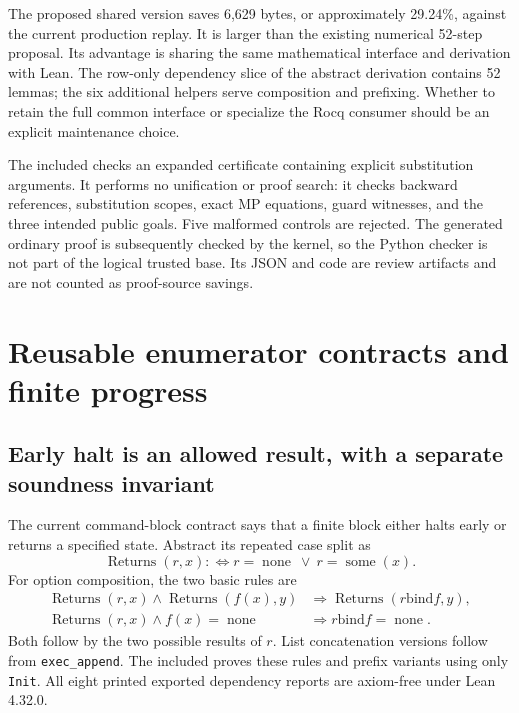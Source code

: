 \documentclass[11pt,letterpaper]{article}
\newcommand{\code}[1]{\texttt{\small #1}}
\begin{document}
The proposed shared version saves 6,629 bytes, or approximately 29.24\%, against the
current production replay. It is larger than the existing numerical 52-step proposal.
Its advantage is sharing the same mathematical interface and derivation with Lean.
The row-only dependency slice of the abstract derivation contains 52 lemmas; the six
additional helpers serve composition and prefixing. Whether to retain the full common
interface or specialize the Rocq consumer should be an explicit maintenance choice.

The included  checks an expanded certificate containing
explicit substitution arguments. It performs no unification or proof search: it checks
backward references, substitution scopes, exact MP equations, guard witnesses, and
the three intended public goals. Five malformed controls are rejected. The generated
ordinary proof is subsequently checked by the kernel, so the Python checker is not
part of the logical trusted base. Its JSON and code are review artifacts and are not
counted as proof-source savings.

\section{Reusable enumerator contracts and finite progress}

\subsection{Early halt is an allowed result, with a separate soundness invariant}

The current command-block contract says that a finite block either halts early or
returns a specified state. Abstract its repeated case split as
\[
 \operatorname{Returns}(r,x):\Longleftrightarrow
       r=\operatorname{none}\ \lor\ r=\operatorname{some}(x).
\]
For option composition, the two basic rules are
\begin{align*}
 \operatorname{Returns}(r,x)\land\operatorname{Returns}(f(x),y)
   &\Longrightarrow\operatorname{Returns}(r\mathbin{\mathrm{bind}}f,y),\\
 \operatorname{Returns}(r,x)\land f(x)=\operatorname{none}
   &\Longrightarrow r\mathbin{\mathrm{bind}}f=\operatorname{none}.
\end{align*}
Both follow by the two possible results of \(r\). List concatenation versions follow
from \code{exec\_append}. The included  proves these
rules and prefix variants using only \code{Init}. All eight printed exported
dependency reports are axiom-free under Lean 4.32.0.
\end{document}
